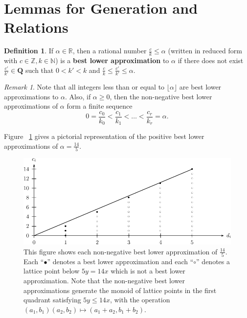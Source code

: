 \documentclass{amsart}
\theoremstyle{plain}
\theoremstyle{definition}
\newtheorem{defn}[thm]{Definition}
\theoremstyle{remark}
\newtheorem{rem}[thm]{Remark}
\numberwithin{equation}{section}
\newcommand\bn{{\mathbb N}}
\newcommand\br{{\mathbb R}}
\newcommand\bz{{\mathbb Z}}
\begin{document}
\section{Lemmas for Generation and Relations}
\label{sec:lemmas}

\begin{defn}
\label{defn:lower-approximation}
If $\alpha \in \br$, then a rational number $\frac{c}{k} \leq \alpha$
(written in reduced form with $c \in \bz, k \in \bn$) is a
\textbf{best lower approximation} to $\alpha$ if there does not
exist $\frac{c'}{k'}\in \mathbf{Q}$ such that $0 < k'< k$ and
$\frac{c}{k} \le \frac{c'}{k'} \le \alpha$. 
\end{defn}

\begin{rem}
\label{rem:lower-approximation}
Note that all integers less than or equal to $\lfloor \alpha \rfloor$
are best lower approximations to $\alpha$. Also, if $\alpha \ge 0$,
then the non-negative best lower approximations of
$\alpha$ form a finite sequence
\[
	0 = \frac{c_0}{k_0} < \frac{c_1}{k_1} < \ldots < \frac{c_r}{k_r} = \alpha.
\]

\noindent
Figure ~\ref{fig:s14/5-lattice} gives a pictorial representation of the positive best lower approximations of $\alpha = \frac{14}{5}$.
\end{rem}

\begin{figure}
\includegraphics{pics/spin-lower-approximations-pic-pics.pdf}
\caption{This figure shows each non-negative best lower
approximation of $\frac{14}{5}.$ Each ``$\bullet$'' denotes a best
lower approximation and each ``$\circ$'' denotes a lattice point
below $5y=14x$ which is not a best lower approximation.  Note that
the non-negative best lower approximations generate the monoid of
lattice points in the first quadrant satisfying  $5y \le 14x$, with
the operation $(a_1, b_1)(a_2, b_2)\mapsto (a_1 + a_2, b_1 + b_2)$.}
\label{fig:s14/5-lattice}
\end{figure}
\end{document}
